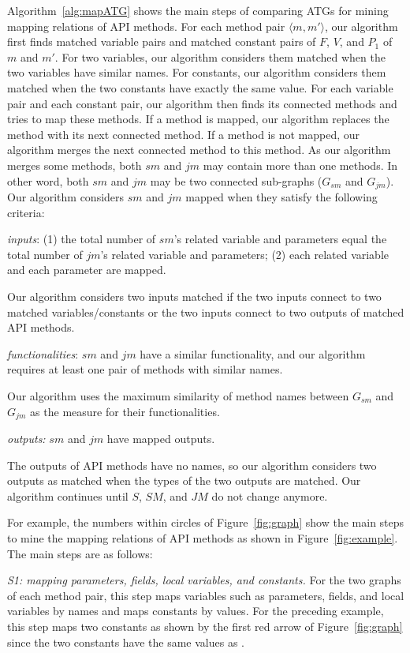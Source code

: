 Algorithm~\ref{alg:mapATG} shows the main steps of comparing ATGs
for mining mapping relations of API methods. For each method pair
$\langle m, m'\rangle$, our algorithm first finds matched variable
pairs and matched constant pairs of $F$, $V$, and $P_1$ of $m$ and
$m'$. For two variables, our algorithm considers them matched when
the two variables have similar names. For constants, our algorithm
considers them matched when the two constants have exactly the same
value. For each variable pair and each constant pair, our algorithm
then finds its connected methods and tries to map these methods. If
a method is mapped, our algorithm replaces the method with its next
connected method. If a method is not mapped, our algorithm merges
the next connected method to this method. As our algorithm merges
some methods, both $sm$ and $jm$ may contain more than one methods.
In other word, both $sm$ and $jm$ may be two connected sub-graphs
($G_{sm}$ and $G_{jm}$). Our algorithm considers $sm$ and $jm$
mapped when they satisfy the following criteria:

\emph{inputs}: (1) the total number of $sm$'s related variable and
parameters equal the total number of $jm$'s related variable and
parameters; (2) each related variable and each parameter are mapped.

Our algorithm considers two inputs matched if the two inputs connect
to two matched variables/constants or the two inputs connect to two
outputs of matched API methods.

\emph{functionalities}: $sm$ and $jm$ have a similar functionality,
and our algorithm requires at least one pair of methods with similar
names.

Our algorithm uses the maximum similarity of method names between
$G_{sm}$ and $G_{jm}$ as the measure for their functionalities.

\emph{outputs:} $sm$ and $jm$ have mapped outputs.


The outputs of API methods have no names, so our algorithm considers
two outputs as matched when the types of the two outputs are
matched. Our algorithm continues until $S$, $SM$, and $JM$ do not
change anymore.

For example, the numbers within circles of Figure~\ref{fig:graph}
show the main steps to mine the mapping relations of API methods as
shown in Figure~\ref{fig:example}. The main steps are as follows:

\emph{S1: mapping parameters, fields, local variables, and
constants.} For the two graphs of each method pair, this step maps
variables such as parameters, fields, and local variables by names
and maps constants by values. For the preceding example, this step
maps two constants as shown by the first red arrow of
Figure~\ref{fig:graph} since the two constants have the same values
as .

